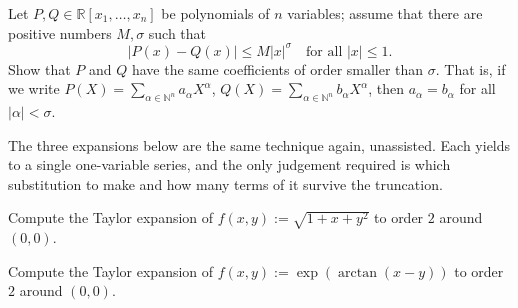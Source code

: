 
\begin{exercise}
\label{ex:polynomials_multivariate_expansion}
Let $P, Q \in \mathbb{R}[x_1,\dots,x_n]$ be polynomials of $n$ variables; assume that there are
positive numbers $M, \sigma$ such that
$$|P(x) - Q(x)| \leq M|x|^\sigma \quad \text{for all } |x| \leq 1.$$
Show that $P$ and $Q$ have the same coefficients of order smaller than $\sigma$. That is, if we
write $P(X) = \sum_{\alpha\in\mathbb{N}^n} a_\alpha X^\alpha$,
$Q(X) = \sum_{\alpha\in\mathbb{N}^n} b_\alpha X^\alpha$, then $a_\alpha = b_\alpha$ for all
$|\alpha| < \sigma$.
\end{exercise}

The three expansions below are the same technique again, unassisted. Each yields to a single
one-variable series, and the only judgement required is which substitution to make and how many
terms of it survive the truncation.

\begin{exercise}
\label{ex:taylor_expansion_sqrt_1_plus_x_plus_y2}
Compute the Taylor expansion of $f(x,y) := \sqrt{1+x+y^2}$ to order $2$ around $(0,0)$.
\end{exercise}

\begin{exercise}
\label{ex:taylor_expansion_exp_arctan}
Compute the Taylor expansion of $f(x,y) := \exp(\arctan(x-y))$ to order $2$ around $(0,0)$.
\end{exercise}

